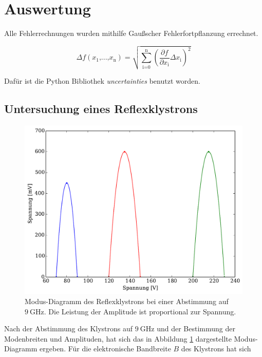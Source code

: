 \section{Auswertung} %
\label{sec:auswertung}

Alle Fehlerrechnungen wurden mithilfe Gaußscher Fehlerfortpflanzung errechnet.

\begin{equation}
	\Delta f(x_\text{1}\text{,...,}x_\text{n}) = \sqrt{\sum_\text{i=0}^\text{n} \left(\frac{\partial f}{\partial x_\text{i}} \Delta x_\text{i}\right)^2}
\end{equation}

Dafür ist die Python Bibliothek \textit{uncertainties} benutzt worden.

\subsection{Untersuchung eines Reflexklystrons} %
\label{sub:untersuchung_der_}

\begin{figure}
	\includegraphics[width = 14cm]{pic/ModenDiagramm.pdf}
	\caption[]{Modus-Diagramm des Reflexklystrons bei einer Abstimmung auf $\SI{9}{\giga\hertz}$. Die Leistung der Amplitude ist proportional zur Spannung.}
	\label{mode}
\end{figure}

Nach der Abstimmung des Klystrons auf $\SI{9}{\giga\hertz}$ und der Bestimmung der Modenbreiten und Amplituden, hat sich das in Abbildung \ref{mode} dargestellte Modus-Diagramm ergeben.
Für die elektronische Bandbreite $B$ des Klystrons hat sich 

